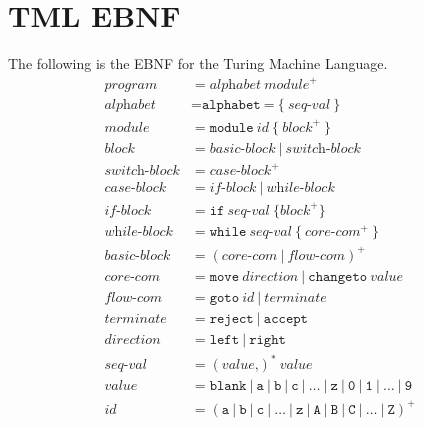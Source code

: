 \chapter{TML EBNF}
The following is the EBNF for the Turing Machine Language.
\begin{align*}
    \textit{program} &= \textit{alphabet} \ \textit{module}^+ \\
    \textit{alphabet} &= \texttt{alphabet} \ \texttt{=} \ \texttt{\{} \ \textit{seq-val} \ \texttt{\}} \\
    \textit{module} &= \texttt{module} \ \textit{id} \ \texttt{\{} \ \textit{block}^+ \ \texttt{\}} \\
    \textit{block} &= \textit{basic-block} \ | \ \textit{switch-block} \\
    \textit{switch-block} &= \textit{case-block}^+ \\
    \textit{case-block} &= \textit{if-block} \ | \ \textit{while-block} \\
    \textit{if-block} &= \texttt{if} \ \textit{seq-val} \ \texttt{\{} \textit{block}^+ \texttt{\}} \\
    \textit{while-block} &= \texttt{while} \ \textit{seq-val} \ \texttt{\{} \ \textit{core-com}^+ \ \texttt{\}} \\
    \textit{basic-block} &= (\textit{core-com} \ | \ \textit{flow-com})^+ \\
    \textit{core-com} &= \texttt{move} \ \textit{direction} \ | \ \texttt{changeto} \ \textit{value} \\
    \textit{flow-com} &= \texttt{goto} \ \textit{id} \ | \ \textit{terminate} \\
    \textit{terminate} &= \texttt{reject} \ | \ \texttt{accept} \\
    \textit{direction} &= \texttt{left} \ | \ \texttt{right} \\
    \textit{seq-val} &= (\textit{value} \texttt{,})^* \ \textit{value} \\
    \textit{value} &= \texttt{blank} \ | \ \texttt{a} \ | \ \texttt{b} \ | \ \texttt{c} \ | \ \dots \ | \ \texttt{z} \ | \ \texttt{0} \ | \ \texttt{1} \ | \ \dots \ | \ \texttt{9} \\
    \textit{id} &= (\texttt{a} \ | \ \texttt{b} \ | \ \texttt{c} \ | \ \dots \ | \ \texttt{z} \ | \ \texttt{A} \ | \ \texttt{B} \ | \ \texttt{C} \ | \ \dots \ | \ \texttt{Z})^+
\end{align*}